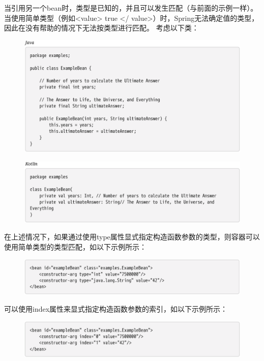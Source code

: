 \newpage
当引用另一个bean时，类型是已知的，并且可以发生匹配（与前面的示例一样）。 当使用简单类型（例如<value> true </ value>）时，Spring无法确定值的类型，因此在没有帮助的情况下无法按类型进行匹配。 考虑以下类：
\begin{figure}[ht]
    \centering
    \includegraphics[width=1\linewidth]{./Figure/IMG_code_25.png}
\end{figure}

\begin{figure}[ht]
    \centering
    \includegraphics[width=1\linewidth]{./Figure/IMG_code_26.png}
\end{figure}

在上述情况下，如果通过使用type属性显式指定构造函数参数的类型，则容器可以使用简单类型的类型匹配，如以下示例所示：

\begin{figure}[ht]
    \centering
    \includegraphics[width=1\linewidth]{./Figure/IMG_code_27.png}
\end{figure}

\newpage
可以使用index属性来显式指定构造函数参数的索引，如以下示例所示：

\begin{figure}[ht]
    \centering
    \includegraphics[width=1\linewidth]{./Figure/IMG_code_28.png}
\end{figure}

